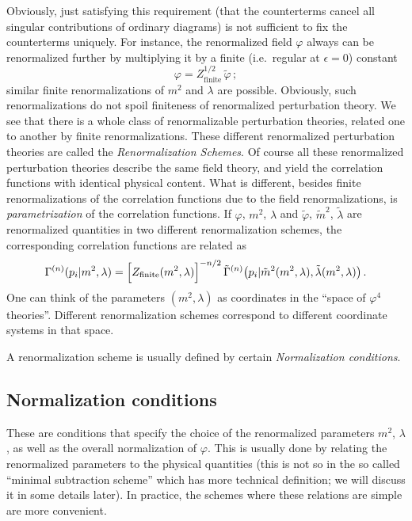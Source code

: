 Obviously, just satisfying this requirement (that the counterterms cancel all
singular contributions of ordinary diagrams) is not sufficient to fix the
counterterms uniquely. For instance, the renormalized field $\varphi$ always can
be renormalized further by multiplying it by a finite (i.e.\ regular at
$\epsilon=0$) constant
\[
\varphi=Z_{\text{finite}}^{1/2}\,\tilde\varphi\,;
\]
similar finite renormalizations of $m^2$ and $\lambda$ are possible. Obviously,
such renormalizations do not spoil finiteness of renormalized perturbation
theory. We see that there is a whole class of renormalizable perturbation
theories, related one to another by finite renormalizations. These different
renormalized perturbation theories are called the \emph{Renormalization
Schemes}. Of course all these renormalized perturbation theories describe the
same field theory, and yield the correlation functions with identical physical
content. What is different, besides finite renormalizations of the correlation
functions due to the field renormalizations, is \emph{parametrization} of the
correlation functions. If $\varphi$, $m^2$, $\lambda$ and $\tilde\varphi$,
$\tilde m^2$, $\tilde\lambda$ are renormalized quantities in two different
renormalization schemes, the corresponding correlation functions are related as
\[
\Gamma^{(n)}(p_i|m^2,\lambda)=\Bigl[Z_{\text{finite}}(m^2,\lambda)\Bigr]^{-n/2}\,
\tilde\Gamma^{(n)}\bigl(p_i|\tilde m^2(m^2,\lambda),\tilde\lambda(m^2,\lambda)\bigr)\,.
\]
One can think of the parameters $(m^2,\lambda)$ as coordinates in the ``space
of $\varphi^4$ theories''. Different renormalization schemes correspond to
different coordinate systems in that space.

A renormalization scheme is usually defined by certain \emph{Normalization
conditions}.

\subsection*{Normalization conditions}

These are conditions that specify the choice of the renormalized parameters
$m^2$, $\lambda$, as well as the overall normalization of $\varphi$. This is
usually done by relating the renormalized parameters to the physical quantities
(this is not so in the so called ``minimal subtraction scheme'' which has more
technical definition; we will discuss it in some details later). In practice,
the schemes where these relations are simple are more convenient.

